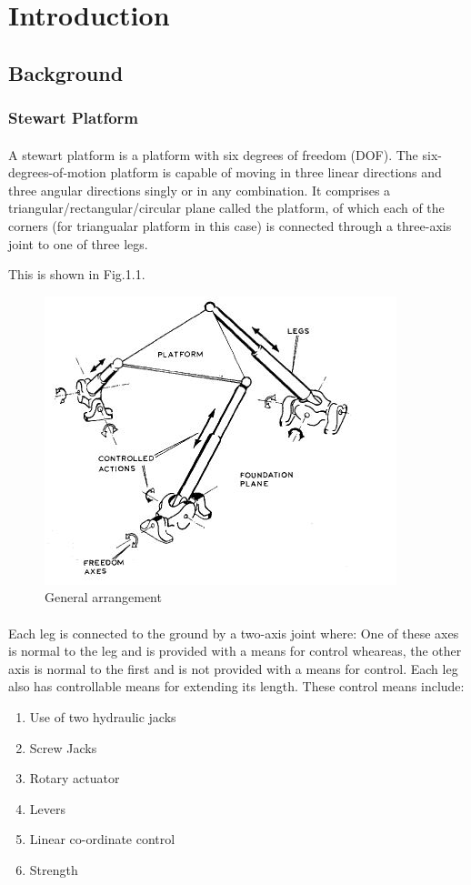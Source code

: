 \section{Introduction}
\subsection{Background}
\subsubsection{Stewart Platform}
\paragraph{}A stewart platform is a platform with six degrees of freedom (DOF). The six-degrees-of-motion platform is capable of moving in three linear directions and
three angular directions singly or in any combination.
It comprises a triangular/rectangular/circular plane called the platform, of which each of the corners (for triangualar platform in this case) is connected through a three-axis joint to one of three legs.

 This is shown in Fig.1.1.
\begin{center}
	\begin{figure}[!h]
	\centering
	\includegraphics{Figures/Fig1}
	\caption{General arrangement}
	\end{figure}
\end{center}
\paragraph{}Each leg is connected to the ground by a two-axis joint where: One of these axes is
normal to the leg and is provided with a means for control wheareas, the other axis is normal to the first and is not provided with a means for control.
Each leg also has controllable means for extending its length. These control means include:
\begin{enumerate}
\item Use of two hydraulic jacks
\item Screw Jacks
\item Rotary actuator
\item Levers
\item Linear co-ordinate control
\item Strength
\end{enumerate}

